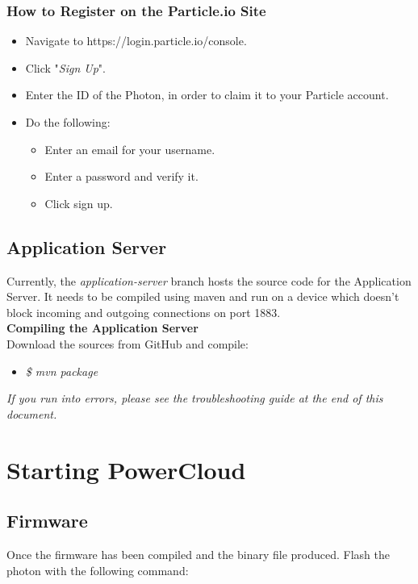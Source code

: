 \documentclass[a4paper,10pt]{article}
\begin{document}
		\subsubsection{How to Register on the Particle.io Site}
			\begin{itemize}
				\item Navigate to https://login.particle.io/console.
				\item Click "\textit{Sign Up}".
				\item Enter the ID of the Photon, in order to claim it to your Particle account.
				\item Do the following:
				\begin{itemize}
					\item Enter an email for your username.
					\item Enter a password and verify it.
					\item Click sign up.
				\end{itemize}
			\end{itemize}
				
	\subsection{Application Server}
	Currently, the \textit{application-server} branch hosts the source code for 
	the Application Server. It needs to be compiled using maven and run on a 
	device which doesn't block incoming and outgoing connections on port 1883.\\
	
	\textbf{Compiling the Application Server}\\
	Download the sources from GitHub and compile:\\
	
	\begin{itemize}
		\item \textit{\$ mvn package}
	\end{itemize}		
	
	\textit{If you run into errors, please see the troubleshooting guide at the end of this document.}
	
	\newpage
	\section{Starting PowerCloud}
	\subsection{Firmware}
	Once the firmware has been compiled and the binary file produced. Flash the photon with the following command:
	
\end{document}

